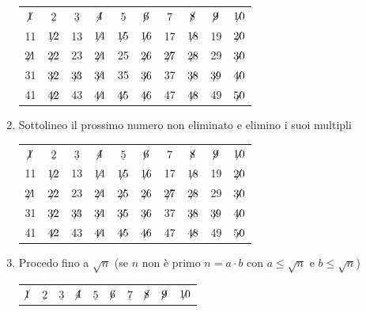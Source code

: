 \documentclass[12pt, letterpaper]{report}
\begin{document}
\begin{enumerate}
			\begin{tabular}{c c c c c c c c c c}
				$\centernot{1}$ & $\underline{2}$ & $\underline{3}$ & $\centernot{4}$ & 5 & $\centernot{6}$ & 7 & $\centernot{8}$ & $\centernot{9}$ & $\centernot{10}$ \\
				11 & $\centernot{12}$ & 13 & $\centernot{14}$ & $\centernot{15}$ & $\centernot{16}$ & 17 & $\centernot{18}$ & 19 & $\centernot{20}$ \\
				$\centernot{21}$ & $\centernot{22}$ & 23 & $\centernot{24}$ & 25 & $\centernot{26}$ & $\centernot{27}$ & $\centernot{28}$ & 29 & $\centernot{30}$ \\
				31 & $\centernot{32}$ & $\centernot{33}$ & $\centernot{34}$ & 35 & $\centernot{36}$ & 37 & $\centernot{38}$ & $\centernot{39}$ & $\centernot{40}$ \\
				41 & $\centernot{42}$ & 43 & $\centernot{44}$ & $\centernot{45}$ & $\centernot{46}$ & 47 & $\centernot{48}$ & 49 & $\centernot{50}$
			\end{tabular}
			\item Sottolineo il prossimo numero non eliminato e elimino i suoi multipli \\
			\begin{tabular}{c c c c c c c c c c}
				$\centernot{1}$ & $\underline{2}$ & $\underline{3}$ & $\centernot{4}$ & $\underline{5}$ & $\centernot{6}$ & 7 & $\centernot{8}$ & $\centernot{9}$ & $\centernot{10}$ \\
				11 & $\centernot{12}$ & 13 & $\centernot{14}$ & $\centernot{15}$ & $\centernot{16}$ & 17 & $\centernot{18}$ & 19 & $\centernot{20}$ \\
				$\centernot{21}$ & $\centernot{22}$ & 23 & $\centernot{24}$ & $\centernot{25}$ & $\centernot{26}$ & $\centernot{27}$ & $\centernot{28}$ & 29 & $\centernot{30}$ \\
				31 & $\centernot{32}$ & $\centernot{33}$ & $\centernot{34}$ & $\centernot{35}$ & $\centernot{36}$ & 37 & $\centernot{38}$ & $\centernot{39}$ & $\centernot{40}$ \\
				41 & $\centernot{42}$ & 43 & $\centernot{44}$ & $\centernot{45}$ & $\centernot{46}$ & 47 & $\centernot{48}$ & 49 & $\centernot{50}$
			\end{tabular}
			\item Procedo fino a $\sqrt{n}$ (se $n$ non è primo $n = a \cdot b$ con $a \leq \sqrt{n}$ e $b \leq \sqrt{n}$) \\
			\begin{tabular}{c c c c c c c c c c}
				$\centernot{1}$ & $\underline{2}$ & $\underline{3}$ & $\centernot{4}$ & $\underline{5}$ & $\centernot{6}$ & $\underline{7}$ & $\centernot{8}$ & $\centernot{9}$ & $\centernot{10}$ \\

\end{tabular}
\end{enumerate}
\end{document}
